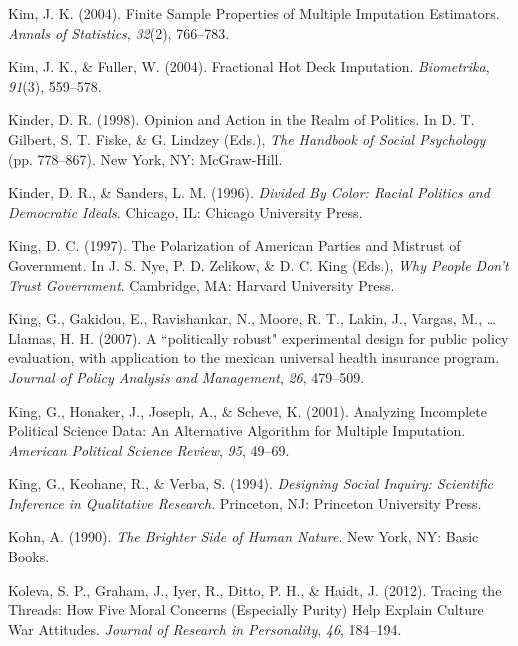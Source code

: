 \documentclass[12pt,econ]{sources/authesis}
\begin{document}
\leavevmode\hypertarget{ref-kim_2004_finite}{}%
Kim, J. K. (2004). Finite Sample Properties of Multiple Imputation Estimators. \emph{Annals of Statistics}, \emph{32}(2), 766--783.

\leavevmode\hypertarget{ref-kim_2004_fractional}{}%
Kim, J. K., \& Fuller, W. (2004). Fractional Hot Deck Imputation. \emph{Biometrika}, \emph{91}(3), 559--578.

\leavevmode\hypertarget{ref-kinder_1998_opinion}{}%
Kinder, D. R. (1998). Opinion and Action in the Realm of Politics. In D. T. Gilbert, S. T. Fiske, \& G. Lindzey (Eds.), \emph{The Handbook of Social Psychology} (pp. 778--867). New York, NY: McGraw-Hill.

\leavevmode\hypertarget{ref-kinder_1996_divided}{}%
Kinder, D. R., \& Sanders, L. M. (1996). \emph{Divided By Color: Racial Politics and Democratic Ideals}. Chicago, IL: Chicago University Press.

\leavevmode\hypertarget{ref-king_polarization_1997}{}%
King, D. C. (1997). The Polarization of American Parties and Mistrust of Government. In J. S. Nye, P. D. Zelikow, \& D. C. King (Eds.), \emph{Why People Don't Trust Government}. Cambridge, MA: Harvard University Press.

\leavevmode\hypertarget{ref-king_a-politically_2007}{}%
King, G., Gakidou, E., Ravishankar, N., Moore, R. T., Lakin, J., Vargas, M., \ldots{} Llamas, H. H. (2007). A ``politically robust" experimental design for public policy evaluation, with application to the mexican universal health insurance program. \emph{Journal of Policy Analysis and Management}, \emph{26}, 479--509.

\leavevmode\hypertarget{ref-king_2001_analyzing}{}%
King, G., Honaker, J., Joseph, A., \& Scheve, K. (2001). Analyzing Incomplete Political Science Data: An Alternative Algorithm for Multiple Imputation. \emph{American Political Science Review}, \emph{95}, 49--69.

\leavevmode\hypertarget{ref-king_designing_1994}{}%
King, G., Keohane, R., \& Verba, S. (1994). \emph{Designing Social Inquiry: Scientific Inference in Qualitative Research}. Princeton, NJ: Princeton University Press.

\leavevmode\hypertarget{ref-kohn_brighter_1990}{}%
Kohn, A. (1990). \emph{The Brighter Side of Human Nature}. New York, NY: Basic Books.

\leavevmode\hypertarget{ref-koleva_2012_tracing}{}%
Koleva, S. P., Graham, J., Iyer, R., Ditto, P. H., \& Haidt, J. (2012). Tracing the Threads: How Five Moral Concerns (Especially Purity) Help Explain Culture War Attitudes. \emph{Journal of Research in Personality}, \emph{46}, 184--194.
\end{document}

